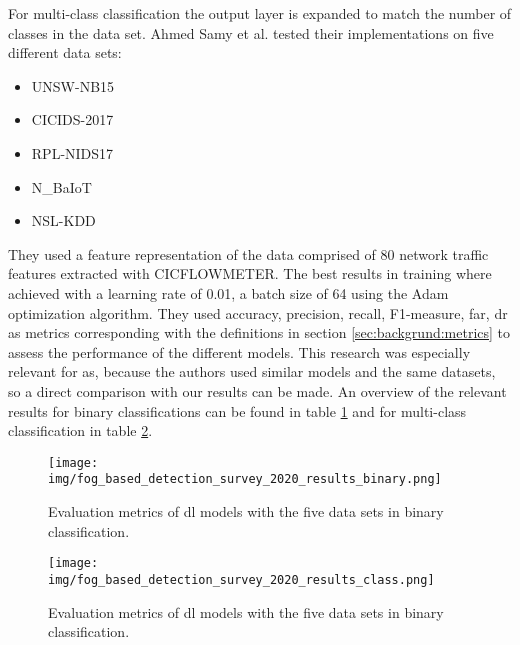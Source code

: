 For multi-class classification the output layer is expanded to match the number of classes in the data set.
Ahmed Samy et al. tested their implementations on five different data sets:

\begin{itemize}
	\item UNSW-NB15 \cite{unsw_nb15}
	\item CICIDS-2017 \cite{cic_ids_2017}
	\item RPL-NIDS17 \cite{rpl_nids17}
	\item N\_BaIoT \cite{n_baiot}
	\item NSL-KDD \cite{nsl_kdd}
\end{itemize}

They used a feature representation of the data comprised of 80 network traffic features extracted with CICFLOWMETER.
The best results in training where achieved with a learning rate of 0.01, a batch size of 64 using the Adam optimization algorithm.
They used accuracy, precision, recall, F1-measure, \gls{far}, \gls{dr} as metrics corresponding with the definitions in section \ref{sec:backgrund:metrics} to assess the performance of the different models. This research was especially relevant for as, because the authors 
used similar models and the same datasets, so a direct comparison with our results can be made.
An overview of the relevant results for binary classifications can be found in table \ref{fig:stateofart:fog_based_detection_survey_2020_results_binary} and for multi-class classification in table \ref{fig:stateofart:fog_based_detection_survey_2020_results_class}.


\begin{figure}[H]
	\centering
	\texttt{[image: img/fog\_based\_detection\_survey\_2020\_results\_binary.png]}
	\caption{Evaluation metrics of \gls{dl} models with the five data sets in binary classification. \cite{fog_based_detection_survey_2020}}
	\label{fig:stateofart:fog_based_detection_survey_2020_results_binary}
\end{figure}

\begin{figure}[H]
	\centering
	\texttt{[image: img/fog\_based\_detection\_survey\_2020\_results\_class.png]}
	\caption{Evaluation metrics of \gls{dl} models with the five data sets in binary classification. \cite{fog_based_detection_survey_2020}}
	\label{fig:stateofart:fog_based_detection_survey_2020_results_class}
\end{figure}

